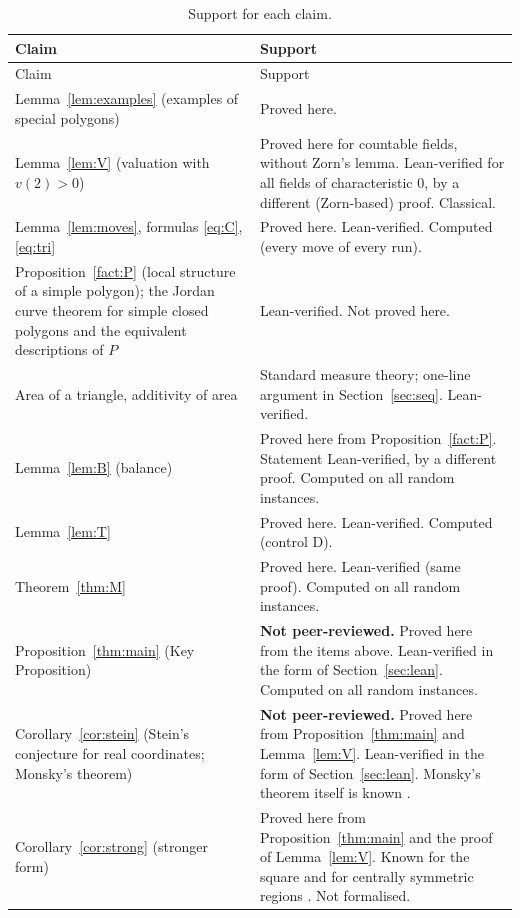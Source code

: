 \documentclass[11pt]{article}
\theoremstyle{definition}
\begin{document}
{\small
\begin{longtable}{@{}>{\raggedright\arraybackslash}p{5.2cm}>{\raggedright\arraybackslash}p{9.8cm}@{}}
\caption{Support for each claim.}\label{tab:support}\\
\toprule
Claim & Support\\
\midrule
\endfirsthead
\toprule
Claim & Support\\
\midrule
\endhead
\bottomrule
\endfoot
Lemma~\ref{lem:examples} (examples of special polygons) & Proved here.\\
Lemma~\ref{lem:V} (valuation with $v(2)>0$) & Proved here for countable fields, without Zorn's lemma. Lean-verified for all fields of characteristic $0$, by a different (Zorn-based) proof. Classical.\\
Lemma~\ref{lem:moves}, formulas \eqref{eq:C}, \eqref{eq:tri} & Proved here. Lean-verified. Computed (every move of every run).\\
Proposition~\ref{fact:P} (local structure of a simple polygon); the Jordan curve theorem for simple closed polygons and the equivalent descriptions of $P$ & Lean-verified. Not proved here.\\
Area of a triangle, additivity of area & Standard measure theory; one-line argument in Section~\ref{sec:seq}. Lean-verified.\\
Lemma~\ref{lem:B} (balance) & Proved here from Proposition~\ref{fact:P}. Statement Lean-verified, by a different proof. Computed on all random instances.\\
Lemma~\ref{lem:T} & Proved here. Lean-verified. Computed (control D).\\
Theorem~\ref{thm:M} & Proved here. Lean-verified (same proof). Computed on all random instances.\\
Proposition~\ref{thm:main} (Key Proposition) & \textbf{Not peer-reviewed.} Proved here from the items above. Lean-verified in the form of Section~\ref{sec:lean}. Computed on all random instances.\\
Corollary~\ref{cor:stein} (Stein's conjecture for real coordinates; Monsky's theorem) & \textbf{Not peer-reviewed.} Proved here from Proposition~\ref{thm:main} and Lemma~\ref{lem:V}. Lean-verified in the form of Section~\ref{sec:lean}. Monsky's theorem itself is known \cite{Mon70}.\\
Corollary~\ref{cor:strong} (stronger form) & Proved here from Proposition~\ref{thm:main} and the proof of Lemma~\ref{lem:V}. Known for the square \cite{Mon70} and for centrally symmetric regions \cite{Mon90}. Not formalised.\\

\end{longtable}}
\end{document}
